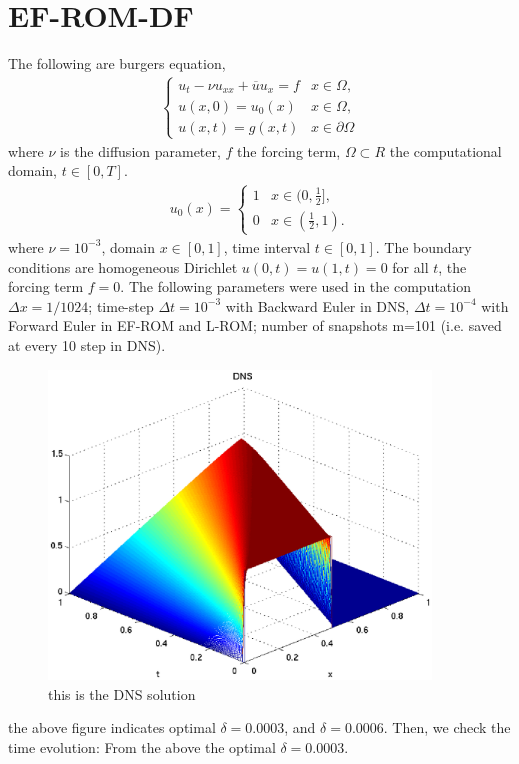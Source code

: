 \documentclass[paper=a4, fontsize=11pt]{scrartcl} %
\numberwithin{equation}{section} %
\numberwithin{figure}{section} %
\numberwithin{table}{section} %
\begin{document}
\section{EF-ROM-DF}
The following are burgers equation,
\begin{eqnarray}
  \left\{\begin{array}{ll}
  u_t-\nu u_{xx}+\overline{u}u_x=f& x\in\Omega,\\
  u(x,0)=u_0(x)& x\in\Omega,\\
  u(x,t)=g(x,t)&  x\in\partial\Omega
  \end{array} \right.
 \end{eqnarray}
where $\nu$ is the diffusion parameter, $f$ the forcing term, $\Omega\subset R$ the computational domain, $t\in[0,T]$. 
\begin{eqnarray}
u_0(x)=\left\{\begin{array}{ll}
1&  x\in(0,\frac{1}{2}],\\
0&  x\in(\frac{1}{2},1).
\end{array}
\right.
\end{eqnarray}
where $\nu=10^{-3}$, domain $x\in[0,1]$, time interval $t\in[0,1]$.  The boundary conditions are homogeneous Dirichlet $u(0,t)=u(1,t)=0$ for all $t$, the forcing term $f=0$. The following parameters were used in the computation $\Delta x=1/1024$;  time-step $\Delta t=10^{-3}$ with Backward Euler in DNS, $\Delta t=10^{-4}$ with Forward Euler in EF-ROM and L-ROM; number of snapshots m=101 (i.e. saved at every 10 step in DNS).
\begin{figure}[htp]
\centering
\includegraphics[width=4in]{DNS.eps}
\caption{this is the DNS solution}
\end{figure}
the above figure indicates optimal $\delta=0.0003$, and $\delta=0.0006$. Then, we check the time evolution:
From the above the optimal $\delta=0.0003$.
\clearpage
\end{document}
